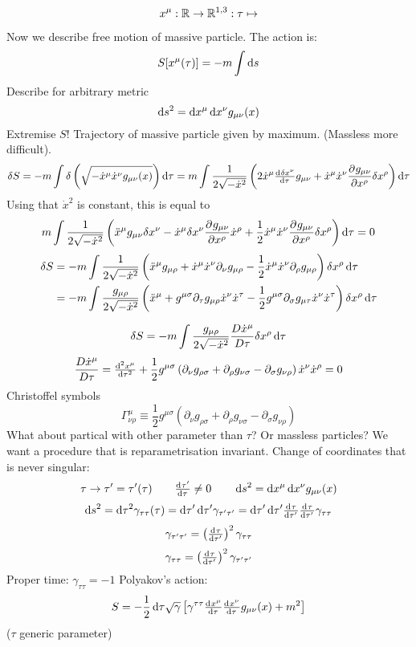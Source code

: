\[x^\mu : \mathbb{R} \to \mathbb{R}^{1,3}: \tau \mapsto \]


Now we describe free motion of massive particle. The action is:
\[ S[x^\mu(\tau)] = -m\int \operatorname{d \!}{s} \]
Describe for arbitrary metric
\[\operatorname{d \!}{s}^2 = \operatorname{d \!}{x}^\mu \operatorname{d \!}{x}^\nu g_{\mu\nu}(x)\]
Extremise $S$! Trajectory of massive particle given by maximum. (Massless more difficult).
\[\delta S = -m\int \delta\left(\sqrt{-\dot{x}^\mu\dot{x}^\nu g_{\mu\nu}(x)}\right)\diff{\tau} = m \int \frac{1}{2\sqrt{-\dot{x}^2}}\left(2\dot{x}^\mu \od{\delta x^\nu}{\tau} g_{\mu\nu} + \dot{x}^\mu\dot{x}^\nu \pd{g_{\mu\nu}}{x^\rho}\delta x^\rho\right) \diff{\tau}\]
Using that $\dot{x}^2$ is constant, this is equal to
\[ m\int \frac{1}{2\sqrt{-\dot{x}^2}}\left(\ddot{x}^\mu g_{\mu\nu} \delta x^\nu - \dot{x}^\mu \delta x^\nu  \frac{\partial{^{}}g_{\mu\nu}}{\partial{{x^\rho}^{}}} \dot{x}^\rho + \frac{1}{2} \dot{x}^\mu \dot{x}^\nu  \frac{\partial{^{}}g_{\mu\nu}}{\partial{{x^\rho}^{}}}  \delta x^\rho\right) \operatorname{d \!}{\tau} = 0\]
\begin{align*} \delta S &= -m \int \frac{1}{2\sqrt{-\dot{x}^2}}\left(\ddot{x}^\mu g_{\mu\rho} + \dot{x}^\mu \dot{x}^\nu \partial_\nu g_{\mu\rho} - \frac{1}{2} \dot{x}^\mu \dot{x}^\nu \partial_\rho g_{\mu\rho}\right)\delta x^\rho \operatorname{d \!}{\tau} \\
&= -m \int \frac{g_{\mu\rho}}{2\sqrt{-\dot{x}^2}}\left(\ddot{x}^\mu + g^{\mu\sigma} \partial_\tau g_{\mu\rho} \dot{x}^\nu \dot{x}^\tau - \frac{1}{2}g^{\mu\sigma}\partial_\sigma g_{\mu\tau}\dot{x}^\nu \dot{x}^\tau\right)\delta x^\rho \operatorname{d \!}{\tau}
\end{align*}

\[ \delta S = -m \int \frac{g_{\mu\rho}}{2\sqrt{-\dot{x}^2}} \frac{D\dot{x}^\mu}{D\tau} \delta x^\rho \operatorname{d \!}{\tau}\]
\[ \frac{D\dot{x}^\mu}{D\tau} =  \od[2]{x^\mu}{\tau} + \frac{1}{2} g^{\mu\sigma} \left(\partial_\nu g_{\rho\sigma} + \partial_\rho g_{\nu\sigma} - \partial_\sigma g_{\nu\rho}\right)\dot{x}^{\nu}\dot{x}^\rho = 0\]
Christoffel symbols
\[ \Gamma^\mu_{\nu\rho} \equiv \frac{1}{2} g^{\mu\sigma} \left(\partial_\nu g_{\rho\sigma} + \partial_\rho g_{\nu\sigma} - \partial_\sigma g_{\nu\rho}\right)\]
What about partical with other parameter than $\tau$? Or massless particles?
We want a procedure that is reparametrisation invariant.
Change of coordinates that is never singular:
\[ \tau \to \tau'= \tau'(\tau) \qquad \od{\tau'}{\tau} \neq 0 \qquad \diff{s}^2 = \diff{x}^\mu \diff{x}^\nu g_{\mu\nu}(x)\]
\[ \diff{s}^2 = \diff{\tau}^2\gamma_{\tau\tau}(\tau) = \diff{\tau'}\diff{\tau'}\gamma_{\tau'\tau'} = \diff{\tau'}\diff{\tau'}\od{\tau}{\tau'}\od{\tau}{\tau'}\gamma_{\tau\tau}\]
\[ \gamma_{\tau'\tau'} = \left(\od{\tau}{\tau'} \right)^2\gamma_{\tau\tau} \]
\[ \gamma_{\tau\tau} = \left(\od{\tau}{\tau'} \right)^2\gamma_{\tau'\tau'} \]
Proper time: $\gamma_{\tau\tau} = -1$
Polyakov's action:
\[ S = - \frac{1}{2} \diff{\tau} \sqrt{\gamma} \left[ \gamma^{\tau\tau} \od{x^\mu}{\tau} \od{x^\nu}{\tau} g_{\mu\nu}(x) + m^2 \right] \]
($\tau$ generic parameter)

